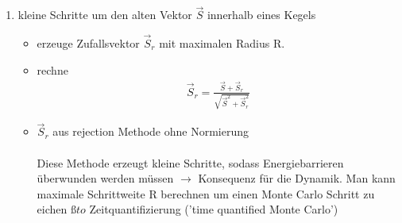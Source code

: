 \documentclass[12pt]{article}
\begin{document}
\begin{enumerate}
\begin{enumerate}
			\item kleine Schritte um den alten Vektor $\vec{S}$ innerhalb eines Kegels
			\begin{itemize}
			\item erzeuge Zufallsvektor $\vec{S}_r$ mit maximalen Radius R.
			\item rechne 
			\begin{align}
			\vec{S}_r = \frac{\vec{S} + \vec{S}_r}{\sqrt{\vec{S}^2 + \vec{S}_r^2}}
			\end{align}
			\item $\vec{S}_r$ aus rejection Methode ohne Normierung
			\\
			\\
			
			
Diese Methode erzeugt kleine Schritte, sodass Energiebarrieren überwunden werden müssen $\to$ Konsequenz für die Dynamik. Man kann maximale Schrittweite R berechnen um einen Monte Carlo Schritt zu eichen $ßto$ Zeitquantifizierung ('time quantified Monte Carlo')
			\end{itemize}
\end{enumerate}
\end{enumerate}
\end{document}
